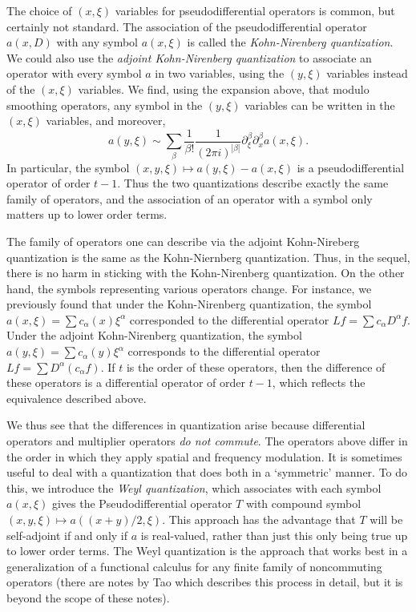 The choice of $(x,\xi)$ variables for pseudodifferential operators is common, but certainly not standard. The association of the pseudodifferential operator $a(x,D)$ with any symbol $a(x,\xi)$ is called the \emph{Kohn-Nirenberg quantization}. We could also use the \emph{adjoint Kohn-Nirenberg quantization} to associate an operator with every symbol $a$ in two variables, using the $(y,\xi)$ variables instead of the $(x,\xi)$ variables. We find, using the expansion above, that modulo smoothing operators, any symbol in the $(y,\xi)$ variables can be written in the $(x,\xi)$ variables, and moreover,
%
\[ a(y,\xi) \sim \sum_\beta \frac{1}{\beta!} \frac{1}{(2 \pi i)^{|\beta|}} \partial^\beta_\xi \partial^\beta_x a(x,\xi). \]
%
In particular, the symbol $(x,y,\xi) \mapsto a(y,\xi) - a(x,\xi)$ is a pseudodifferential operator of order $t - 1$. Thus the two quantizations describe exactly the same family of operators, and the association of an operator with a symbol only matters up to lower order terms.

The family of operators one can describe via the adjoint Kohn-Nireberg quantization is the same as the Kohn-Niernberg quantization. Thus, in the sequel, there is no harm in sticking with the Kohn-Nirenberg quantization. On the other hand, the symbols representing various operators change. For instance, we previously found that under the Kohn-Nirenberg quantization, the symbol $a(x,\xi) = \sum c_\alpha(x) \xi^\alpha$ corresponded to the differential operator $Lf = \sum c_\alpha D^\alpha f$. Under the adjoint Kohn-Nirenberg quantization, the symbol $a(y,\xi) = \sum c_\alpha(y) \xi^\alpha$ corresponds to the differential operator $Lf = \sum D^\alpha( c_\alpha f)$. If $t$ is the order of these operators, then the difference of these operators is a differential operator of order $t-1$, which reflects the equivalence described above.

We thus see that the differences in quantization arise because differential operators and multiplier operators \emph{do not commute}. The operators above differ in the order in which they apply spatial and frequency modulation. It is sometimes useful to deal with a quantization that does both in a `symmetric' manner. To do this, we introduce the \emph{Weyl quantization}, which associates with each symbol $a(x,\xi)$ gives the Pseudodifferential operator $T$ with compound symbol $(x,y,\xi) \mapsto a((x + y)/2, \xi)$. This approach has the advantage that $T$ will be self-adjoint if and only if $a$ is real-valued, rather than just this only being true up to lower order terms. The Weyl quantization is the approach that works best in a generalization of a functional calculus for any finite family of noncommuting operators (there are notes by Tao which describes this process in detail, but it is beyond the scope of these notes).

